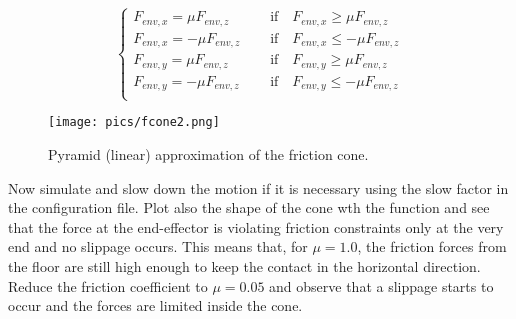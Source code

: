 \documentclass[11pt]{article}
\begin{document}
\begin{equation*}
\begin{cases}
F_{env, x} = \mu F_{env, z}  \quad &\text{   if}\quad F_{env, x} \geq \mu F_{env, z} \\ 
F_{env, x} = -\mu F_{env, z}  \quad &\text{   if}\quad F_{env, x} \leq -\mu F_{env, z} \\ 
F_{env, y} = \mu F_{env, z}  \quad &\text{   if}\quad F_{env, y} \geq \mu F_{env, z} \\ 
F_{env, y} = -\mu F_{env, z}  \quad &\text{   if}\quad F_{env, y} \leq -\mu F_{env, z} \\ 
\end{cases}
\end{equation*}
%
 \begin{figure}[bht]
 	\centering
 	\texttt{[image: pics/fcone2.png]}
 	\caption{Pyramid (linear) approximation of the friction cone.}
 	\label{fig:fcone}
 \end{figure}
Now simulate and slow down the motion if it is necessary using the slow factor in the configuration file. 
Plot also the shape of the cone wth the  function and  see that the force at the end-effector is violating friction constraints only at the very end and no slippage occurs. This means that, for $\mu = 1.0$, the friction forces from the floor are still high enough to keep the contact in the horizontal direction.  Reduce the friction coefficient to $\mu = 0.05$ and observe that a slippage starts to occur and the forces are limited inside the cone.  
% 
\end{document}
